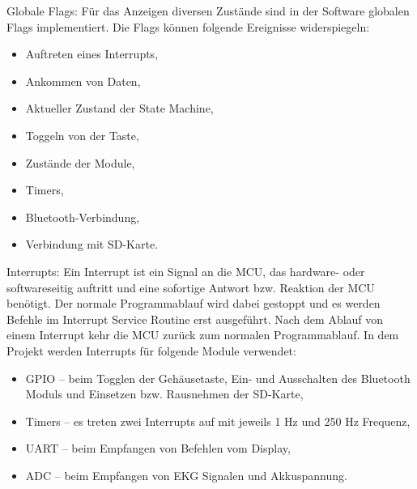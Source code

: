 Globale Flags: Für das Anzeigen diversen Zustände sind in der Software globalen Flags implementiert. Die Flags können folgende Ereignisse widerspiegeln:
\begin{itemize}
    \item Auftreten eines Interrupts,
    \item Ankommen von Daten,
    \item Aktueller Zustand der State Machine,
    \item Toggeln von der Taste,
    \item Zustände der Module,
    \item Timers,
    \item Bluetooth-Verbindung,
    \item Verbindung mit SD-Karte.
\end{itemize} 

Interrupts: Ein Interrupt ist ein Signal an die MCU, das hardware- oder softwareseitig auftritt und eine sofortige Antwort bzw. Reaktion der MCU benötigt. Der normale Programmablauf wird dabei gestoppt und es werden Befehle im Interrupt Service Routine erst ausgeführt. Nach dem Ablauf von einem Interrupt kehr die MCU zurück zum normalen Programmablauf.
In dem Projekt werden Interrupts für folgende Module verwendet:
\begin{itemize}
    \item GPIO – beim Togglen der Gehäusetaste, Ein- und Ausschalten des Bluetooth Moduls und Einsetzen bzw. Rausnehmen der SD-Karte,
    \item Timers – es treten zwei Interrupts auf mit jeweils 1 Hz und 250 Hz Frequenz,
    \item UART – beim Empfangen von Befehlen vom Display,
    \item ADC – beim Empfangen von EKG Signalen und Akkuspannung.
\end{itemize} 

